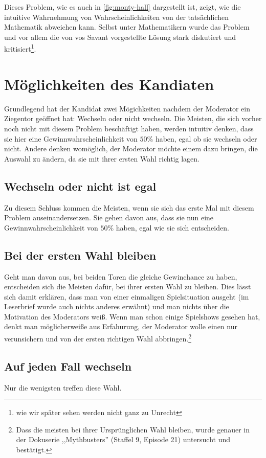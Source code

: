 Dieses Problem, wie es auch in \autoref{fig:monty-hall} dargestellt ist, zeigt, wie die intuitive Wahrnehmung von Wahrscheinlichkeiten von der tatsächlichen Mathematik abweichen kann. Selbst unter Mathematikern wurde das Problem und vor allem die von vos Savant vorgestellte Lösung stark diskutiert und kritisiert\footnote{wie wir später sehen werden nicht ganz zu Unrecht}.

\section{Möglichkeiten des Kandiaten}

Grundlegend hat der Kandidat zwei Mögichkeiten nachdem der Moderator ein Ziegentor geöffnet hat: Wechseln oder nicht wechseln. Die Meisten, die sich vorher noch nicht mit diesem Problem beschäftigt haben, werden intuitiv denken, dass sie hier eine Gewinnwahrscheinlichkeit von $50\%$ haben, egal ob sie wechseln oder nicht. Andere denken womöglich, der Moderator möchte einem dazu bringen, die Auswahl zu ändern, da sie mit ihrer ersten Wahl richtig lagen.

\subsection{Wechseln oder nicht ist egal}

Zu diesem Schluss kommen die Meisten, wenn sie sich das erste Mal mit diesem Problem auseinandersetzen. Sie gehen davon aus, dass sie nun eine Gewinnwahrscheinlichkeit von $50\%$ haben, egal wie sie sich entscheiden.

\subsection{Bei der ersten Wahl bleiben}

Geht man davon aus, bei beiden Toren die gleiche Gewinchance zu haben, entscheiden sich die Meisten dafür, bei ihrer ersten Wahl zu bleiben. Dies lässt sich damit erklären, dass man von einer einmaligen Spielsituation ausgeht (im Leserbrief wurde auch nichts anderes erwähnt) und man nichts über die Motivation des Moderators weiß. Wenn man schon einige Spielshows gesehen hat, denkt man möglicherweiße aus Erfahurung, der Moderator wolle einen nur verunsichern und von der ersten richtigen Wahl abbringen.\footnote{Dass die meisten bei ihrer Ursprünglichen Wahl bleiben, wurde genauer in der Dokuserie ,,Mythbusters'' (Staffel 9, Episode 21) untersucht und bestätigt.}

\subsection{Auf jeden Fall wechseln}

Nur die wenigsten treffen diese Wahl.


